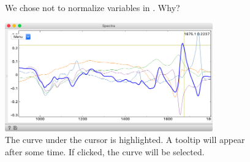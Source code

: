\begin{figure}[h]
\centering
{}
\caption{We chose not to normalize variables in . Why?}

\end{figure}

\begin{figure}
  \includegraphics[width=0.8\textwidth]{components.png}%
  \caption{The curve under the cursor is highlighted. A tooltip will appear after some time. If clicked, the curve will be selected.}
\end{figure}

